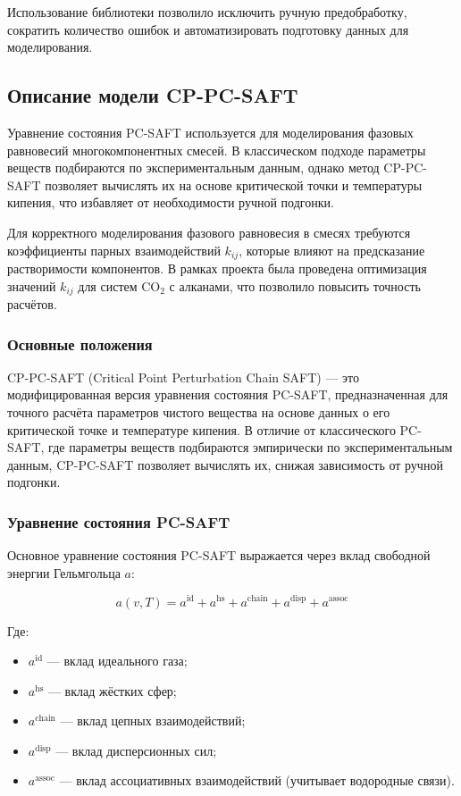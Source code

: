 \documentclass[a4paper,12pt]{article}
\begin{document}
Использование библиотеки позволило исключить ручную предобработку, сократить количество ошибок и автоматизировать подготовку данных для моделирования.

\subsection{Описание модели CP-PC-SAFT}

Уравнение состояния PC-SAFT используется для моделирования фазовых равновесий многокомпонентных смесей. В классическом подходе параметры веществ подбираются по экспериментальным данным, однако метод CP-PC-SAFT позволяет вычислять их на основе критической точки и температуры кипения, что избавляет от необходимости ручной подгонки.

Для корректного моделирования фазового равновесия в смесях требуются коэффициенты парных взаимодействий \( k_{ij} \), которые влияют на предсказание растворимости компонентов. В рамках проекта была проведена оптимизация значений \( k_{ij} \) для систем $\mathrm{CO}_{2}$ с алканами, что позволило повысить точность расчётов.

\subsubsection{Основные положения}

CP-PC-SAFT (Critical Point Perturbation Chain SAFT) — это модифицированная версия уравнения состояния PC-SAFT, предназначенная для точного расчёта параметров чистого вещества на основе данных о его критической точке и температуре кипения. В отличие от классического PC-SAFT, где параметры веществ подбираются эмпирически по экспериментальным данным, CP-PC-SAFT позволяет вычислять их, снижая зависимость от ручной подгонки.

\subsubsection{Уравнение состояния PC-SAFT}

Основное уравнение состояния PC-SAFT выражается через вклад свободной энергии Гельмгольца \( a \):

\begin{equation}
a(v, T) = a^{\text{id}} + a^{\text{hs}} + a^{\text{chain}} + a^{\text{disp}} + a^{\text{assoc}}
\end{equation}

Где:
\begin{itemize}
    \item \( a^{\text{id}} \) — вклад идеального газа;
    \item \( a^{\text{hs}} \) — вклад жёстких сфер;
    \item \( a^{\text{chain}} \) — вклад цепных взаимодействий;
    \item \( a^{\text{disp}} \) — вклад дисперсионных сил;
    \item \( a^{\text{assoc}} \) — вклад ассоциативных взаимодействий (учитывает водородные связи).
\end{itemize}
\end{document}
